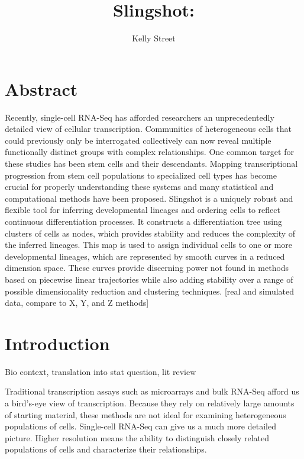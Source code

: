 \documentclass[11pt]{article}\usepackage[]{graphicx}\usepackage[]{color}
\title{Slingshot: }
\author{Kelly Street}
\date{}
\begin{document}
\maketitle

\section{Abstract}
Recently, single-cell RNA-Seq has afforded researchers an unprecedentedly detailed view of cellular transcription. Communities of heterogeneous cells that could previously only be interrogated collectively can now reveal multiple functionally distinct groups with complex relationships. One common target for these studies has been stem cells and their descendants. Mapping transcriptional progression from stem cell populations to specialized cell types has become crucial for properly understanding these systems and many statistical and computational methods have been proposed. Slingshot is a uniquely robust and flexible tool for inferring developmental lineages and ordering cells to reflect continuous differentiation processes. It constructs a differentiation tree using clusters of cells as nodes, which provides stability and reduces the complexity of the inferred lineages. This map is used to assign individual cells to one or more developmental lineages, which are represented by smooth curves in a reduced dimension space. These curves provide discerning power not found in methods based on piecewise linear trajectories while also adding stability over a range of possible dimensionality reduction and clustering techniques. [real and simulated data, compare to X, Y, and Z methods]

\section{Introduction}
Bio context, translation into stat question, lit review

Traditional transcription assays such as microarrays and bulk RNA-Seq afford us a bird's-eye view of transcription. Because they rely on relatively large amounts of starting material, these methods are not ideal for examining heterogeneous populations of cells. Single-cell RNA-Seq can give us a much more detailed picture. Higher resolution means the ability to distinguish closely related populations of cells and characterize their relationships.
\end{document}
